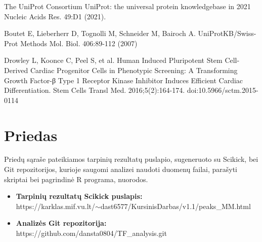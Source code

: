 \documentclass[12pt]{article}
\begin{document}
\begin{thebibliography}{99}
 The UniProt Consortium UniProt: the universal protein
knowledgebase in 2021 Nucleic Acids Res. 49:D1 (2021).

 Boutet E, Lieberherr D, Tognolli M, Schneider M, Bairoch A.
UniProtKB/Swiss-Prot Methods Mol. Biol. 406:89-112 (2007)

 Drowley L, Koonce C, Peel S, et al. Human
Induced Pluripotent Stem Cell-Derived Cardiac Progenitor Cells in Phenotypic
Screening: A Transforming Growth Factor-β Type 1 Receptor Kinase Inhibitor
Induces Efficient Cardiac Differentiation. Stem Cells Transl Med.
2016;5(2):164-174. doi:10.5966/sctm.2015-0114

\end{thebibliography}

\newpage


\section{Priedas}

Priedų sąraše pateikiamos tarpinių rezultatų puslapio, sugeneruoto su Scikick,
bei Git repozitorijos, kurioje saugomi analizei naudoti duomenų failai,
parašyti skriptai bei pagrindinė R programa, nuorodos.

\begin{itemize}
    \item \textbf{Tarpinių rezultatų Scikick puslapis:}\\
        https://karklas.mif.vu.lt/\(\sim\)dast6577/KursinisDarbas/v1.1/peaks\_MM.html
    \item \textbf{Analizės Git repozitorija:}\\
        https://github.com/dansta0804/TF\_analysis.git
  \end{itemize}
\end{document}
